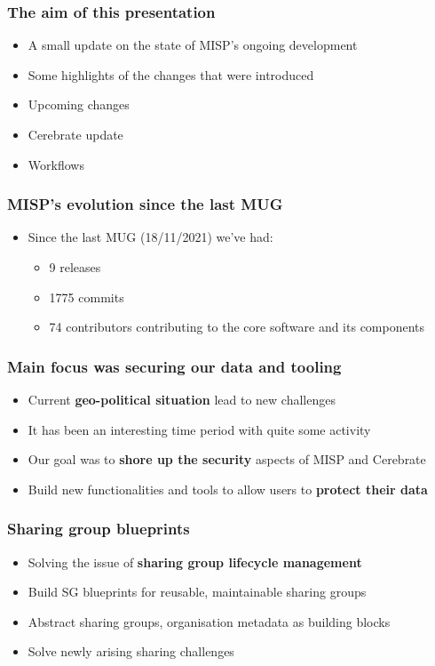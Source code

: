 
\begin{frame}
\titlepage
\end{frame}

\begin{frame}
  \frametitle{The aim of this presentation}
  \begin{itemize}
     \item A small update on the state of MISP's ongoing development
     \item Some highlights of the changes that were introduced
     \item Upcoming changes
     \item Cerebrate update
     \item Workflows
  \end{itemize}
\end{frame}

\begin{frame}
  \frametitle{MISP's evolution since the last MUG}
  \begin{itemize}
    \item Since the last MUG (18/11/2021) we've had:
    \begin{itemize}
        \item 9 releases
        \item 1775 commits
        \item 74 contributors contributing to the core software and its components
    \end{itemize}
  \end{itemize}
\end{frame}

\begin{frame}
  \frametitle{Main focus was securing our data and tooling}
  \begin{itemize}
      \item Current {\bf geo-political situation} lead to new challenges
      \item It has been an interesting time period with quite some activity
      \item Our goal was to {\bf shore up the security} aspects of MISP and Cerebrate
      \item Build new functionalities and tools to allow users to {\bf protect their data}
  \end{itemize}
\end{frame}

\begin{frame}
  \frametitle{Sharing group blueprints}
  \begin{itemize}
     \item Solving the issue of {\bf sharing group lifecycle management}
     \item Build SG blueprints for reusable, maintainable sharing groups
     \item Abstract sharing groups, organisation metadata as building blocks
     \item Solve newly arising sharing challenges
  \end{itemize}
\end{frame}

